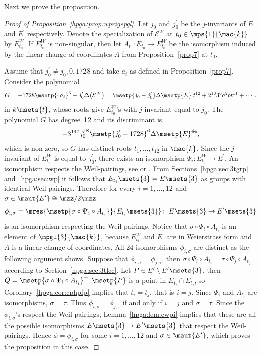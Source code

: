 Next we prove the proposition.

\begin{proof}[Proof of Proposition~\ref{hpga:prop:wprigepgl}] Let $j_0$ and $j_0^\prime$ be the $j$-invariants of $E$ and $E^\prime$ respectively. Denote the specialization of $\mathcal{E}^W$ at $t_0\in\mps{1}{\mac {k}}$ by $E_{t_0}^W$. If $E_{t_0}^W$ is non-singular, then let $A_{t_0}\colon E_{t_0} \rightarrow E_{t_0}^W$ be the isomorphism induced by the linear change of coordinates $A$ from Proposition~\ref{prop7} at $t_0$.

Assume that $j_0^\prime\neq j_0,0,1728$ and take $a_t$ as defined in Proposition~\ref{prop7}. Consider the polynomial
\begin{gather*}
G=-1728\msetp{4a_t}^3-j_0^\prime \Delta\big(\mathcal{E}^W\big) =\msetp{j_0-j_0^\prime}\Delta\msetp{E}\;t^{12}+2^{13}3^6a^2b t^{11}+\cdots.
\end{gather*}
in $k\msets{t}$, whose roots give $E_{t_0}^W$'s with $j$-invariant equal to $j_0^\prime$. The polynomial $G$ has degree~12 and its discriminant is
\begin{gather*}
-3^{147}{j_0^\prime}^8\msetp{j_0^\prime-1728}^6\Delta\msetp{E}^{44},
\end{gather*}
which is non-zero, so $G$ has distinct roots $t_1,\ldots,t_{12}$ in $\mac{k}$. Since the $j$-invariant of $E_{t_i}^W$ is equal to $j_0^\prime$, there exists an isomorphism $\Psi_i\colon E_{t_i}^W\rightarrow E^\prime$. An isomorphism respects the Weil-pairings, see \cite[Proposition~III.8.2]{silverman1985} or \cite[Theorem~3.9]{washington2008}. From Sections~\ref{hpga:sec:3tgrp} and~\ref{hpga:sec:wp} it follows that $E_{t_i} \msets{3}=E\msets{3}$ as groups with identical Weil-pairings. Therefore for every $i=1,\ldots,12$ and $\sigma\in\maut{E^\prime}\cong\mzz/2\mzz$
\begin{gather*}
\phi_{i,\sigma} =\mres{\msetp{\sigma\circ\Psi_i\circ A_{t_i}}}{E_{t_i}\msets{3}}\colon \ E\msets{3} \rightarrow E^\prime\msets{3}
\end{gather*}
is an isomorphism respecting the Weil-pairings. Notice that $\sigma\circ\Psi_i \circ A_{t_i}$ is an element of $\mpgl{3}{\mac{k}}$, because $E_{t_i}^W$ and $E^\prime$ are in Weierstrass form and $A$ is a linear change of coordinates. All 24 isomorphisms $\phi_{i,\sigma}$ are distinct as the following argument shows. Suppose that $\phi_{i,\sigma}=\phi_{j,\tau}$, then $\sigma\circ\Psi_i\circ A_{t_i}=\tau\circ\Psi_j\circ A_{t_j}$ according to Section~\ref{hpga:sec:3tlcc}. Let $P\in E^\prime\setminus E^\prime\msets{3}$, then $Q=\msetp{\sigma\circ\Psi_i \circ A_{t_i}}^{-1}\msetp{P}$ is a point in $E_{t_i}\cap E_{t_j}$, so Corollary~\ref{hpga:cor:cphpfp} implies that $t_i=t_j$, that is $i=j$. Since $\Psi_i$ and $A_{t_i}$ are isomorphisms, $\sigma=\tau$. Thus $\phi_{i,\sigma}=\phi_{j,\tau}$ if and only if $i=j$ and $\sigma=\tau$. Since the $\phi_{i,\sigma}$'s respect the Weil-pairings, Lemma~\ref{hpga:lem:cwpi} implies that these are all the possible isomorphisms $E\msets{3}\rightarrow E^\prime\msets{3}$ that respect the Weil-pairings. Hence $\phi=\phi_{i,\sigma}$ for some $i=1,\ldots,12$ and $\sigma\in\maut{E^\prime}$, which proves the proposition in this case.


\end{proof}
